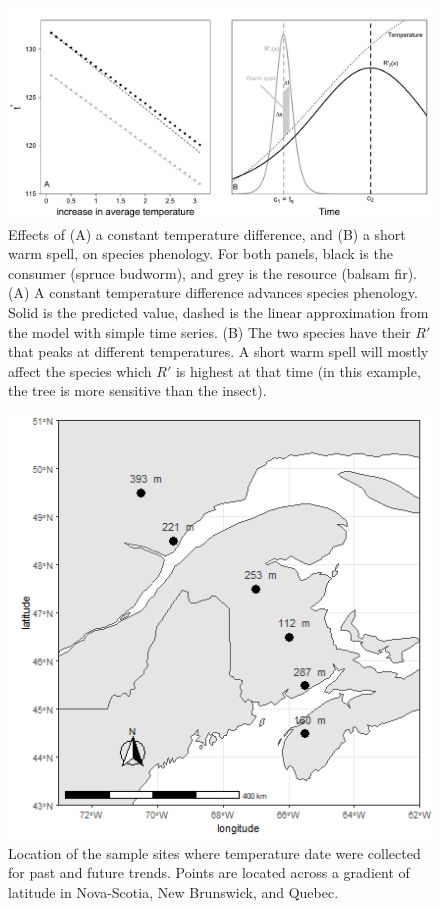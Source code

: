 \documentclass[12 pt]{article}
\begin{document}
\begin{figure}
    \centering
    \includegraphics[width = 17 cm, keepaspectratio]{Figure2}
    \caption{Effects of (A) a constant temperature difference, and (B) a short warm spell, on species phenology. For both panels, black is the consumer (spruce budworm), and grey is the resource (balsam fir). (A) A constant temperature difference advances species phenology. Solid is the predicted value, dashed is the linear approximation from the model with simple time series. (B) The two species have their $R'$ that peaks at different temperatures. A short warm spell will mostly affect the species which $R'$ is highest at that time (in this example, the tree is more sensitive than the insect).}
\end{figure}

\begin{figure}
    \centering
    \includegraphics[width = 13 cm, keepaspectratio]{map_web}
    \caption{Location of the sample sites where temperature date were collected for past and future trends. Points are located across a gradient of latitude in Nova-Scotia, New Brunswick, and Quebec.}
    \label{fig:map}
\end{figure}
\end{document}
